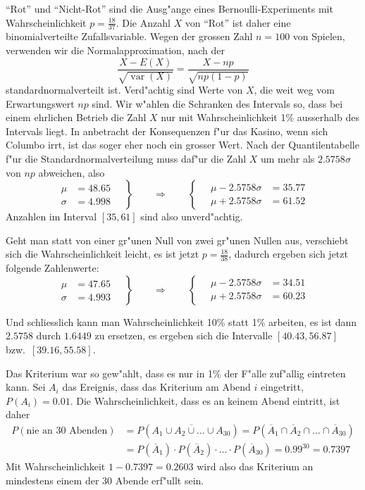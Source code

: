 \begin{loesung}
\begin{teilaufgaben}
\item
``Rot'' und ``Nicht-Rot'' sind die Ausg"ange eines Bernoulli-Experiments mit
Wahrscheinlichkeit $p=\frac{18}{37}$. Die Anzahl $X$ von ``Rot'' ist daher
eine binomialverteilte Zufallsvariable. Wegen der grossen Zahl $n=100$
von Spielen, verwenden wir die Normalapproximation, nach der 
\[
\frac{X-E(X)}{\sqrt{\operatorname{var}(X)}}=\frac{X-np}{\sqrt{np(1-p)}}
\]
standardnormalverteilt ist. Verd"achtig sind Werte von $X$, die weit
weg vom Erwartungswert $np$ sind. Wir w"ahlen die Schranken des Intervals
so, dass bei einem ehrlichen Betrieb die Zahl $X$ nur mit Wahrscheinlichkeit
1\% ausserhalb des Intervals liegt. In anbetracht der Konsequenzen
f"ur das Kasino, wenn sich Columbo irrt, ist das soger eher noch ein
grosser Wert. Nach der Quantilentabelle f"ur die
Standardnormalverteilung muss daf"ur die Zahl $X$ um mehr als $2.5758\sigma$
von $np$ abweichen, also
\[
\left.
\begin{aligned}
\mu&=48.65\\
\sigma&=4.998
\end{aligned}
\quad
\right\}
\qquad
\Rightarrow
\qquad
\left\{\quad
\begin{aligned}
\mu - 2.5758\sigma&=35.77\\
\mu + 2.5758\sigma&=61.52
\end{aligned}
\right.
\]
Anzahlen im Interval $[35,61]$ sind also unverd"achtig.

Geht man statt von einer gr"unen Null von zwei gr"unen Nullen aus, verschiebt
sich die Wahrscheinlichkeit leicht, es ist jetzt $p=\frac{18}{38}$, dadurch
ergeben sich jetzt folgende Zahlenwerte:
\[
\left.
\begin{aligned}
\mu&=47.65\\
\sigma&=4.993
\end{aligned}
\quad
\right\}
\qquad
\Rightarrow
\qquad
\left\{\quad
\begin{aligned}
\mu - 2.5758\sigma&=34.51\\
\mu + 2.5758\sigma&=60.23
\end{aligned}
\right.
\]

Und schliesslich kann man Wahrscheinlichkeit 10\% statt 1\% arbeiten, 
es ist dann $2.5758$ durch $1.6449$ zu ersetzen, es ergeben sich
die Intervalle $[40.43, 56.87]$ bzw.~$[39.16, 55.58]$.
\item
Das Kriterium war so gew"ahlt, dass es nur in 1\% der F"alle zuf"allig
eintreten kann. Sei $A_i$ das Ereignis, dass das Kriterium am Abend $i$
eingetritt, $P(A_i)=0.01$.
Die Wahrscheinlichkeit, dass es an keinem Abend eintritt,
ist daher 
\begin{align*}
P(\text{nie an 30 Abenden})&=P(\overline{A_1\cup A_2\cup\dots\cup A_{30}})
=P(
\overline{A}_1
\cap
\overline{A}_2
\cap
\dots
\cap
\overline{A}_{30}
)
\\
&=
P(\overline{A}_1)
\cdot
P(\overline{A}_2)
\cdot
\dots
\cdot
P(\overline{A}_{30})
=0.99^{30}=0.7397
\end{align*}
Mit Wahrscheinlichkeit $1-0.7397=0.2603$ wird also das Kriterium an mindestens
einem der 30 Abende erf"ullt sein.


\end{teilaufgaben}
\end{loesung}
